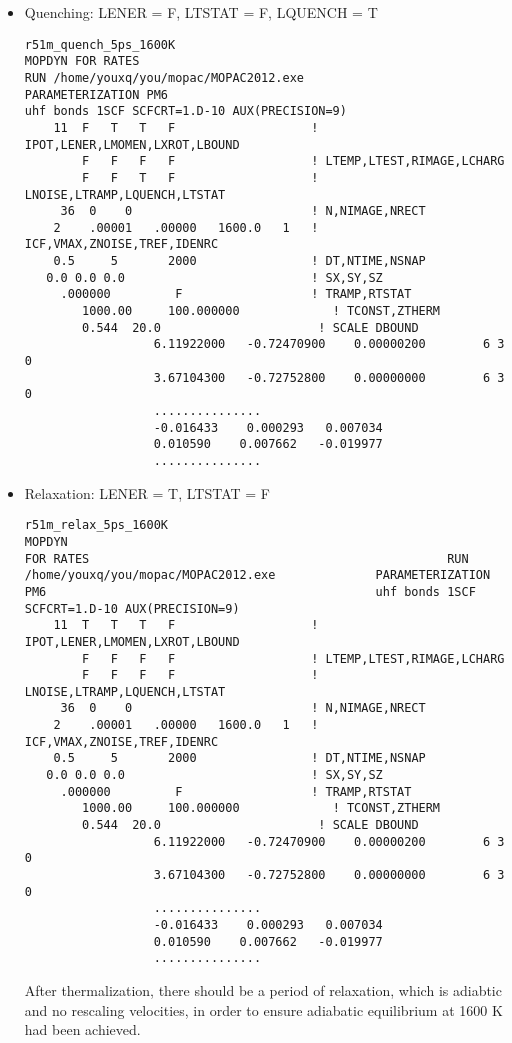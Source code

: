 \documentclass[11pt]{JHEP3}
\begin{document}
\begin{itemize}
\item Quenching: LENER = F, LTSTAT = F, LQUENCH = T
\begin{lstlisting}
r51m_quench_5ps_1600K
MOPDYN FOR RATES
RUN /home/youxq/you/mopac/MOPAC2012.exe
PARAMETERIZATION PM6
uhf bonds 1SCF SCFCRT=1.D-10 AUX(PRECISION=9)
    11  F   T   T   F                   ! IPOT,LENER,LMOMEN,LXROT,LBOUND
        F   F   F   F                   ! LTEMP,LTEST,RIMAGE,LCHARG
        F   F   T   F                   ! LNOISE,LTRAMP,LQUENCH,LTSTAT
     36  0    0                         ! N,NIMAGE,NRECT
    2    .00001   .00000   1600.0   1   ! ICF,VMAX,ZNOISE,TREF,IDENRC
    0.5     5       2000                ! DT,NTIME,NSNAP
   0.0 0.0 0.0                          ! SX,SY,SZ
     .000000         F                  ! TRAMP,RTSTAT
        1000.00     100.000000             ! TCONST,ZTHERM
        0.544  20.0                      ! SCALE DBOUND
                  6.11922000   -0.72470900    0.00000200        6 3 0
                  3.67104300   -0.72752800    0.00000000        6 3 0
                  ...............
                  -0.016433    0.000293   0.007034
                  0.010590    0.007662   -0.019977
                  ...............
\end{lstlisting}

\item Relaxation: LENER = T, LTSTAT = F 
\begin{lstlisting}
r51m_relax_5ps_1600K                                          MOPDYN
FOR RATES                                                  RUN
/home/youxq/you/mopac/MOPAC2012.exe              PARAMETERIZATION
PM6                                              uhf bonds 1SCF
SCFCRT=1.D-10 AUX(PRECISION=9)
    11  T   T   T   F                   ! IPOT,LENER,LMOMEN,LXROT,LBOUND
        F   F   F   F                   ! LTEMP,LTEST,RIMAGE,LCHARG
        F   F   F   F                   ! LNOISE,LTRAMP,LQUENCH,LTSTAT
     36  0    0                         ! N,NIMAGE,NRECT
    2    .00001   .00000   1600.0   1   ! ICF,VMAX,ZNOISE,TREF,IDENRC
    0.5     5       2000                ! DT,NTIME,NSNAP
   0.0 0.0 0.0                          ! SX,SY,SZ
     .000000         F                  ! TRAMP,RTSTAT
        1000.00     100.000000             ! TCONST,ZTHERM
        0.544  20.0                      ! SCALE DBOUND
                  6.11922000   -0.72470900    0.00000200        6 3 0
                  3.67104300   -0.72752800    0.00000000        6 3 0
                  ...............
                  -0.016433    0.000293   0.007034
                  0.010590    0.007662   -0.019977
                  ...............
\end{lstlisting}
After thermalization, there should be a period of relaxation, which 
is adiabtic and no rescaling velocities, in order to ensure 
adiabatic equilibrium at 1600 K had been achieved.
\end{itemize}
\end{document}
